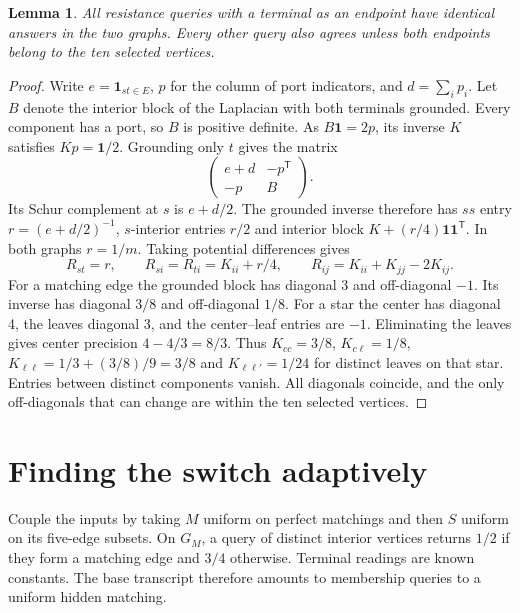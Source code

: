 \documentclass[11pt]{article}
\newtheorem{lemma}{Lemma}
\begin{document}
\begin{lemma}\label{switch}
All resistance queries with a terminal as an endpoint have identical answers in the two graphs. Every other query also agrees unless both endpoints belong to the ten selected vertices.
\end{lemma}
\begin{proof}
Write $e=\boldsymbol{1}_{st\in E}$, $p$ for the column of port indicators, and $d=\sum_i p_i$. Let $B$ denote the interior block of the Laplacian with both terminals grounded. Every component has a port, so $B$ is positive definite. As $B\mathbf{1}=2p$, its inverse $K$ satisfies $Kp=\mathbf{1}/2$. Grounding only $t$ gives the matrix
\[
 \begin{pmatrix}e+d&-p^{\mathsf T}\\-p&B\end{pmatrix}.
\]
Its Schur complement at $s$ is $e+d/2$. The grounded inverse therefore has $ss$ entry $r=(e+d/2)^{-1}$, $s$-interior entries $r/2$ and interior block $K+(r/4)\mathbf{1}\mathbf{1}^{\mathsf T}$. In both graphs $r=1/m$. Taking potential differences gives
\[
 R_{st}=r,\qquad R_{si}=R_{ti}=K_{ii}+r/4,\qquad
 R_{ij}=K_{ii}+K_{jj}-2K_{ij}.
\]
For a matching edge the grounded block has diagonal 3 and off-diagonal $-1$. Its inverse has diagonal $3/8$ and off-diagonal $1/8$. For a star the center has diagonal 4, the leaves diagonal 3, and the center--leaf entries are $-1$. Eliminating the leaves gives center precision $4-4/3=8/3$. Thus $K_{cc}=3/8$, $K_{c\ell}=1/8$, $K_{\ell\ell}=1/3+(3/8)/9=3/8$ and $K_{\ell\ell'}=1/24$ for distinct leaves on that star. Entries between distinct components vanish. All diagonals coincide, and the only off-diagonals that can change are within the ten selected vertices.
\end{proof}

\section{Finding the switch adaptively}
Couple the inputs by taking $M$ uniform on perfect matchings and then $S$ uniform on its five-edge subsets. On $G_M$, a query of distinct interior vertices returns $1/2$ if they form a matching edge and $3/4$ otherwise. Terminal readings are known constants. The base transcript therefore amounts to membership queries to a uniform hidden matching.
\end{document}
